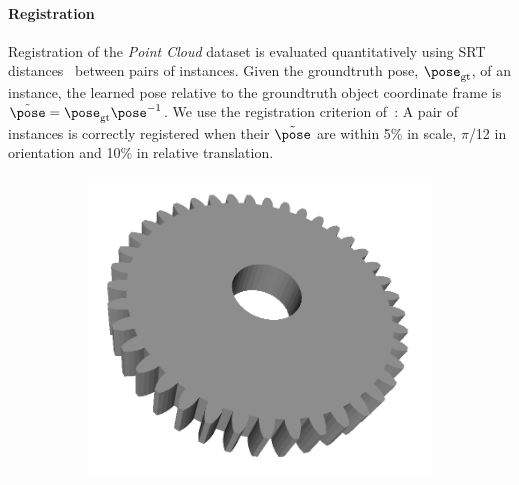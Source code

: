 \paragraph{Registration} 
\label{sec:3dreg}
Registration of the \emph{Point Cloud} dataset is evaluated quantitatively using SRT distances~\cite{Pham2011} between pairs of instances. Given the groundtruth pose, $\pose_\mathrm{gt}$, of an instance, the learned pose relative to the groundtruth object coordinate frame is $\tilde{\pose} = \pose_\mathrm{gt}\pose^{-1}$. We use the registration criterion of~\cite{Pham2011}: A pair of instances is correctly registered when their $\tilde{\pose}$ are within 5\% in scale, $\pi$/12 in orientation and 10\% in relative translation.

\begin{figure}[ht]
	\centering
	\begin{subfigure}[b]{0.20\linewidth}
		\includegraphics[width=\linewidth]{fig/3dreg/cog.png} \\

\end{subfigure}
\end{figure}

